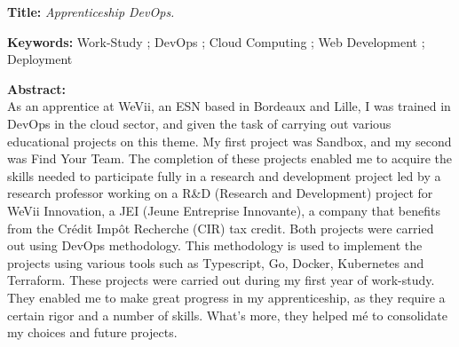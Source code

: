 \begin{mdframed}[style=summary]
    \noindent\textbf{Title:} \textit{Apprenticeship DevOps.}

    \vspace{0.2cm}
    \noindent\textbf{Keywords:} Work-Study ; DevOps ; Cloud Computing ; Web Development ; Deployment

    \vspace{0.3cm}
    \begin{multicols}{2}
        \noindent\textbf{Abstract:} \\
        As an apprentice at WeVii, an ESN based in Bordeaux and Lille, I was trained in DevOps in the cloud sector, and given the task of carrying out various educational projects on this theme.
        My first project was Sandbox, and my second was Find Your Team.
        The completion of these projects enabled me to acquire the skills needed to participate fully in a research and development project led by a research professor working on a R\&D (Research and Development) project for WeVii Innovation, a JEI (Jeune Entreprise Innovante), a company that benefits from the Crédit Impôt Recherche (CIR) tax credit. Both projects were carried out using DevOps methodology.
        This methodology is used to implement the projects using various tools such as Typescript, Go, Docker, Kubernetes and Terraform.
        These projects were carried out during my first year of work-study.
        They enabled me to make great progress in my apprenticeship, as they require a certain rigor and a number of skills.
        What's more, they helped mé to consolidate my choices and future projects.
    \end{multicols}
\end{mdframed}

\clearpage
